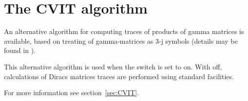 \section{The CVIT algorithm}
\hypertarget{switch:CVIT}{}

An alternative algorithm for computing traces of products of gamma matrices is available,
based on treating of gamma-matrices as 3-j symbols (details may be found in
\cite{Ilyin:89,Kennedy:1982}).

This alternative algorithm is used when the switch  is set to on. With  off,
calculations of Diracs matrices traces are performed using standard \REDUCE{} facilities.

For more information see section~\ref{sec:CVIT}.
\endinput

